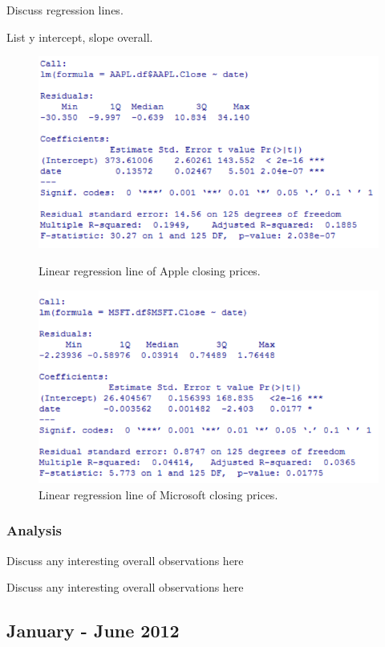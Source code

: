 \documentclass[paper=a4, fontsize=11pt]{scrartcl} %
\numberwithin{equation}{section} %
\numberwithin{figure}{section} %
\numberwithin{table}{section} %
\begin{document}
Discuss regression lines. 

List y intercept, slope overall. 

\begin{figure}[!htb]
  \includegraphics[width=\linewidth]{graph/aapl_reg_2.png}
  \caption{Linear regression line of Apple closing prices.}
\endminipage\hfill
{}
  \includegraphics[width=\linewidth]{graph/msft_reg_2.png}
  \caption{Linear regression line of Microsoft closing prices.}
\endminipage\hfill
\end{figure}


\subsubsection{Analysis}
Discuss any interesting overall observations here

Discuss any interesting overall observations here

\subsection{January - June  2012}
\end{document}
